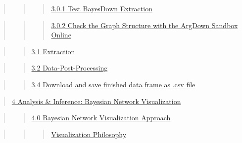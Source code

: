 \documentclass[
  11pt,
  letterpaper,
]{book}
\begin{document}
\begin{quote}
\begin{quote}
\begin{quote}
\hyperref[scrollTo=eUBJh8Qp4yd4ux26uniqifier=1]{3.0.1 Test BayesDown
Extraction}
\end{quote}
\end{quote}
\end{quote}

\begin{quote}
\begin{quote}
\begin{quote}
\hyperref[scrollTo=z4Hgs0ICDQyWux26uniqifier=1]{3.0.2 Check the Graph
Structure with the ArgDown Sandbox Online}
\end{quote}
\end{quote}
\end{quote}

\begin{quote}
\begin{quote}
\hyperref[scrollTo=mv8f4c4D3yJjux26uniqifier=1]{3.1 Extraction}
\end{quote}
\end{quote}

\begin{quote}
\begin{quote}
\hyperref[scrollTo=UcXf3fZ8dahjux26uniqifier=1]{3.2
Data-Post-Processing}
\end{quote}
\end{quote}

\begin{quote}
\begin{quote}
\hyperref[scrollTo=xTwPO_J-dahjux26uniqifier=1]{3.4 Download and save
finished data frame as .csv file}
\end{quote}
\end{quote}

\begin{quote}
\hyperref[scrollTo=nLPEqZI7zSG4ux26uniqifier=1]{4 Analysis \& Inference:
Bayesian Network Visualization}
\end{quote}

\begin{quote}
\begin{quote}
\hyperref[scrollTo=t3zl7vKMECMgux26uniqifier=1]{4.0 Bayesian Network
Visualization Approach}
\end{quote}
\end{quote}

\begin{quote}
\begin{quote}
\begin{quote}
\hyperref[scrollTo=t3zl7vKMECMgux26uniqifier=1]{Visualization
Philosophy}
\end{quote}
\end{quote}
\end{quote}
\end{document}

